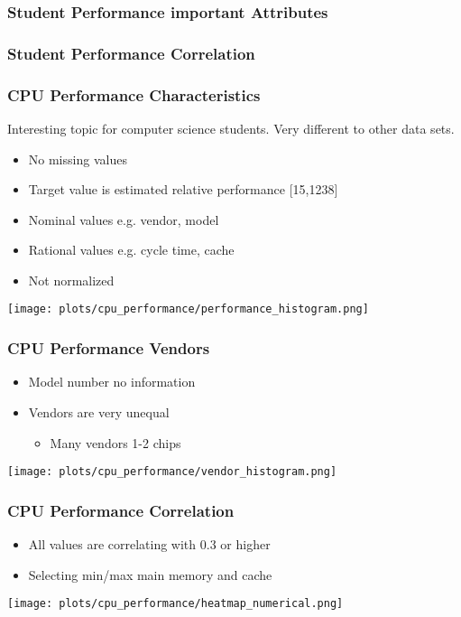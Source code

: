 \documentclass[aspectratio=169]{beamer}
\begin{document}
\begin{frame}{}
\frametitle{Student Performance important Attributes}
\end{frame}

\begin{frame}{}
\frametitle{Student Performance Correlation}
\end{frame}

\begin{frame}{}
\frametitle{CPU Performance Characteristics}
Interesting topic for computer science students. Very different to other data sets.
\begin{minipage}{0.3\textwidth}
\begin{itemize}
\item No missing values
\item Target value is estimated relative performance [15,1238]
\item Nominal values e.g. vendor, model
\item Rational values e.g. cycle time, cache
\item Not normalized
\end{itemize}
\end{minipage}
\begin{minipage}{0.69\textwidth}
    \texttt{[image: plots/cpu\_performance/performance\_histogram.png]}
\end{minipage}
\end{frame}

\begin{frame}{}
\frametitle{CPU Performance Vendors}
\begin{minipage}{0.3\textwidth}
\begin{itemize}
\item Model number no information
\item Vendors are very unequal
\begin{itemize}
	\item Many vendors 1-2 chips
\end{itemize}
\end{itemize}
\end{minipage}
\begin{minipage}{0.69\textwidth}
    \texttt{[image: plots/cpu\_performance/vendor\_histogram.png]}
\end{minipage}
\end{frame}

\begin{frame}{}
\frametitle{CPU Performance Correlation}
\begin{itemize}
	\item All values are correlating with 0.3 or higher
	\item Selecting min/max main memory and cache
\end{itemize}
    \center \texttt{[image: plots/cpu\_performance/heatmap\_numerical.png]}
\end{frame}
\end{document}
